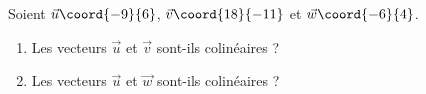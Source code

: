 \begin{exo}{}
	Soient $\vec{u}\coord{-9}{6}$, $\vec{v}\coord{18}{-11}$ et $\vec w\coord{-6}{4}$.

	\begin{enumerate}
		\item Les vecteurs $\vec{u}$ et $\vec{v}$ sont-ils colinéaires ?
		\item Les vecteurs $\vec{u}$ et $\vec{w}$ sont-ils colinéaires ?
	\end{enumerate}
\end{exo}

